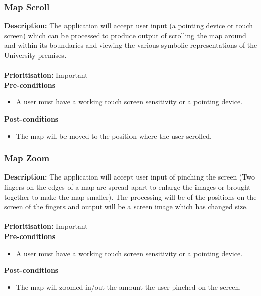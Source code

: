 \documentclass[runningheads,a4paper]{article}
\begin{document}
\subsubsection{Map Scroll}

\textbf{Description:}  The application will accept user input (a pointing device or touch screen) which can be processed to produce output of scrolling the map around and within its boundaries and viewing the various symbolic representations of the University premises.\\\\
\noindent
\textbf{Prioritisation:} Important\\
  
  
\textbf{Pre-conditions}
\begin{itemize}
 	\item A user must have a working touch screen sensitivity or a pointing device.
\end{itemize}
  
\textbf{Post-conditions}
\begin{itemize}
	\item The map will be moved to the position where the user scrolled. 
\end{itemize}

\subsubsection{Map Zoom}

\textbf{Description:}  The application will accept user input of pinching the screen (Two fingers on the edges of a map are spread apart to enlarge the images or brought together to make the map smaller). The processing will be of the positions on the screen of the fingers and output will be a screen image which has changed size.\\\\
\noindent
\textbf{Prioritisation:} Important\\
  
  
\textbf{Pre-conditions}
\begin{itemize}
 	\item A user must have a working touch screen sensitivity or a pointing device.
\end{itemize}
  
\textbf{Post-conditions}
\begin{itemize}
	\item The map will zoomed in/out the amount the user pinched on the screen. 
\end{itemize}
\end{document}
